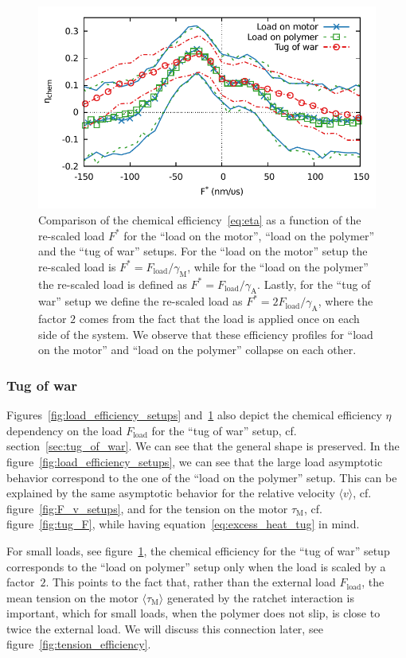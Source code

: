 \documentclass[aps,pre,twocolumn,showpacs,showkeys,superscriptaddress,floatfix]{revtex4-1}
\begin{document}
\begin{figure}[t]
\centering
\includegraphics[width=.45\textwidth,height=!]{F_eta_setup_rescaled.pdf}
\caption{\label{fig:load_efficiency_setups_rescaled}
Comparison of the chemical efficiency~\eqref{eq:eta} as a function of the re-scaled load $F^*$ for the ``load on the motor'', ``load on the polymer'' and the ``tug of war'' setups.
For the ``load on the motor'' setup the re-scaled load is $F^* = F_\text{load} / \gamma_\text{M}$, 
while for the ``load on the polymer'' the re-scaled load is defined as $F^* = F_\text{load} / \gamma_\text{A}$.
Lastly, for the ``tug of war'' setup we define the re-scaled load as $F^* = 2 F_\text{load} / \gamma_\text{A}$,
where the factor $2$ comes from the fact that the load is applied once on each side of the system.
We observe that these efficiency profiles for ``load on the motor'' and ``load on the polymer'' collapse on each other.    
}
\end{figure}


\subsubsection{Tug of war}
Figures~\ref{fig:load_efficiency_setups} and~\ref{fig:load_efficiency_setups_rescaled} also depict the chemical efficiency $\eta$ dependency on the load $F_\text{load}$ for the ``tug of war'' setup, cf. section~\ref{sec:tug_of_war}.
We can see that the general shape is preserved.
In the figure~\ref{fig:load_efficiency_setups}, we can see that the large load asymptotic behavior correspond to the one of the ``load on the polymer'' setup.
This can be explained by the same asymptotic behavior for the relative velocity $\langle v\rangle$, cf. figure~\ref{fig:F_v_setups}, 
and for the tension on the motor $\tau_\text{M}$, cf. figure~\ref{fig:tug_F}, while having equation~\eqref{eq:excess_heat_tug} in mind.

For small loads, see figure~\ref{fig:load_efficiency_setups_rescaled}, the chemical efficiency for the ``tug of war'' setup corresponds to the ``load on polymer'' setup only when the load is scaled by a factor~$2$. 
This points to the fact that, rather than the external load $F_\text{load}$, the mean tension on the motor $\langle \tau_\text{M} \rangle$ generated by the ratchet interaction is important,
which for small loads, when the polymer does not slip, is close to twice the external load. 
We will discuss this connection later, see figure~\ref{fig:tension_efficiency}. 
\end{document}
